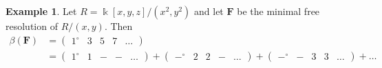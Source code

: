 \documentclass[12pt]{amsart}
\theoremstyle{definition}
\newtheorem{example}[lemma]{Example}
\theoremstyle{remark}
\newcommand{\kk}{\Bbbk}
\newcommand{\FF}{\mathbf{F}}
\newcommand{\zp}{\circ}
\begin{document}
%

\begin{example}
Let $R=\kk[x,y,z]/(x^2,y^2)$ and let $\FF$ be the minimal free resolution of $R/(x,y)$.  Then
\begin{align*}
\beta(\FF)&=\begin{pmatrix}1^\zp&3&5&7&\dots \end{pmatrix}\\
&=\begin{pmatrix}1^\zp&1&-&-&\dots \end{pmatrix}+\begin{pmatrix}-^\zp&2&2&-&\dots \end{pmatrix}+\begin{pmatrix}-^\zp&-&3&3&\dots \end{pmatrix}+\dots
\end{align*}
\end{example}
\end{document}
